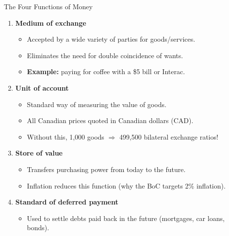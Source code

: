 \documentclass[aspectratio=169]{beamer}
\begin{document}
\begin{frame}{The Four Functions of Money}
\transfade
\begin{enumerate}
  \item \textbf{Medium of exchange}
  \begin{itemize}
    \item Accepted by a wide variety of parties for goods/services.
    \item Eliminates the need for double coincidence of wants.
    \item \textbf{Example:} paying for coffee with a \$5 bill or Interac.
  \end{itemize}
  \item \textbf{Unit of account}
  \begin{itemize}
    \item Standard way of measuring the value of goods.
    \item All Canadian prices quoted in \alert{Canadian dollars (CAD)}.
    \item Without this, 1{,}000 goods $\Rightarrow$ 499{,}500 bilateral exchange ratios!
  \end{itemize}
  \item \textbf{Store of value}
  \begin{itemize}
    \item Transfers purchasing power from today to the future.
    \item \alert{Inflation} reduces this function (why the BoC targets 2\% inflation).
  \end{itemize}
  \item \textbf{Standard of deferred payment}
  \begin{itemize}
    \item Used to settle debts paid back in the future (mortgages, car loans, bonds).
  \end{itemize}
\end{enumerate}
\end{frame}
\end{document}
